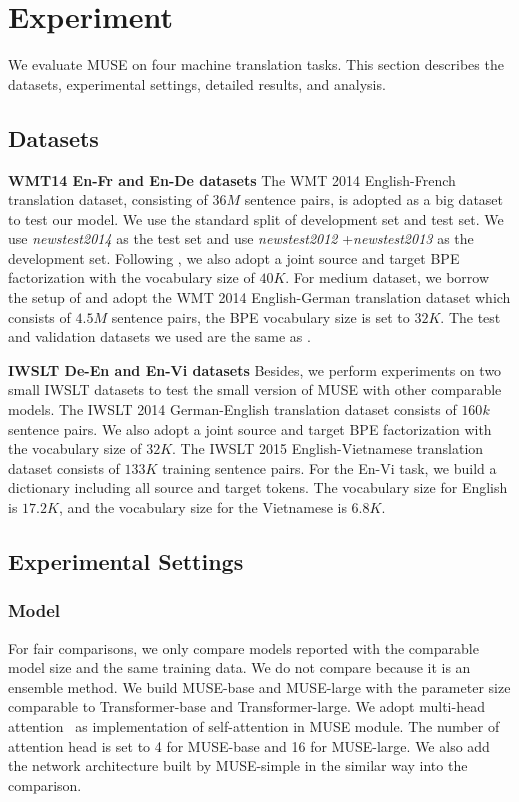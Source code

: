 \documentclass{article} \usepackage{iclr2020_conference,times}
\begin{document}
\section{Experiment}
We evaluate MUSE on four machine translation tasks. This section describes the datasets, experimental settings, detailed results, and analysis. \subsection{Datasets}
\textbf{WMT14 En-Fr and En-De datasets} The WMT 2014 English-French translation dataset, consisting of $36M$  sentence pairs, is adopted as a big dataset to test our model. We use the standard split of development set and test set. We use \textit{newstest2014} as the test set and use \textit{newstest2012} +\textit{newstest2013} as the development set. Following \citet{gehring2017convolutional}, we also adopt a joint source and target BPE factorization with the vocabulary size of $40K$.
For medium dataset, we borrow the setup of \citet{vaswani2017attention} and adopt the WMT 2014 English-German translation dataset which consists of $4.5M$ sentence pairs, the BPE vocabulary size is set to $32K$. The test and validation  datasets we used are the same as \citet{vaswani2017attention}.

\textbf{IWSLT De-En and En-Vi datasets} Besides, we perform experiments on two small IWSLT datasets to test the small version of MUSE with other comparable models. The IWSLT 2014 German-English translation dataset consists of $160k$ sentence pairs. We also adopt a joint source and target BPE factorization with the vocabulary size of $32K$. The IWSLT 2015 English-Vietnamese translation dataset consists of $133K$ training sentence pairs. For the En-Vi task, we build a dictionary including all source and target tokens. The vocabulary size for English is $17.2K$, and the vocabulary size for the Vietnamese is $6.8K$. 



\subsection{Experimental Settings}
\subsubsection{Model}
For fair comparisons, we only compare models reported with the comparable model size and the same training data. We do not compare \citet{Wu_2019} because it is an  ensemble method. We build MUSE-base and MUSE-large with the parameter size  comparable to Transformer-base and Transformer-large. We adopt multi-head attention~\citep{vaswani2017attention} as implementation of self-attention in MUSE module. The number of attention head is set to 4 for MUSE-base and 16 for MUSE-large. We also add the network architecture built by MUSE-simple  in the similar way into the comparison.
\end{document}
